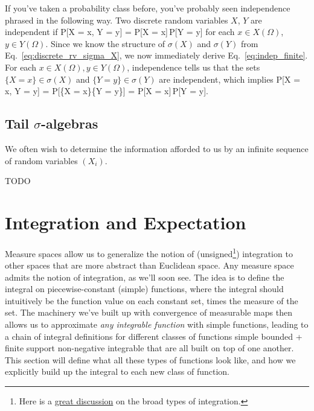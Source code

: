\begin{example}
	If you've taken a probability class before, you've probably seen independence phrased in the following way. Two discrete random variables $X$, $Y$ are independent if
	\eq
		\mathbb P[X = x, Y = y] = \mathbb P[X = x]\,\mathbb P[Y = y]
		\label{eq:indep_finite}
	\qe
	for each $x\in X(\Omega)$, $y\in Y(\Omega)$. Since we know the structure of $\sigma(X)$ and $\sigma(Y)$ from Eq.~\eqref{eq:discrete_rv_sigma_X}, we now immediately derive Eq.~\eqref{eq:indep_finite}. For each $x\in X(\Omega), y\in Y(\Omega)$, independence tells us that the sets $\{X = x\}\in\sigma(X)$ and $\{Y = y\}\in\sigma(Y)$ are independent, which implies
	\eq
		\mathbb P[X = x, Y = y] = \mathbb P[\{X = x\}\cap \{Y = y\}] = \mathbb P[X = x]\,\mathbb P[Y = y].
	\qe
\end{example}

\subsection{Tail $\sigma$-algebras}

We often wish to determine the information afforded to us by an infinite sequence of random variables $(X_i)$. 

{\color{red}TODO}


\newpage
\section{Integration and Expectation}

Measure spaces allow us to generalize the notion of (unsigned\footnote{Here is a \href{https://math.stackexchange.com/questions/49641/integration-of-forms-and-integration-on-a-measure-space?rq=1}{great discussion} on the broad types of integration.}) integration to other spaces that are more abstract than Euclidean space. Any measure space admits the notion of integration, as we'll soon see. The idea is to define the integral on piecewise-constant (simple) functions, where the integral should intuitively be the function value on each constant set, times the measure of the set. The machinery we've built up with convergence of measurable maps then allows us to approximate \textit{any integrable function} with simple functions, leading to a chain of integral definitions for different classes of functions
\eq
	\textnormal{simple} \longrightarrow \textnormal{bounded + finite support} \longrightarrow \textnormal{non-negative} \longrightarrow \textnormal{integrable}
	\label{eq:steps_of_integral_construction}
\qe
that are all built on top of one another. This section will define what all these types of functions look like, and how we explicitly build up the integral to each new class of function. 

